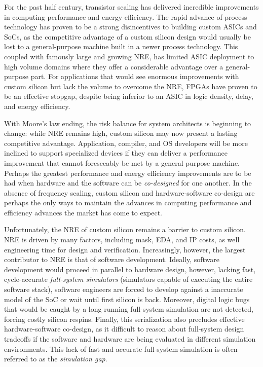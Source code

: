 For the past half century, transistor scaling has delivered incredible
improvements in computing performance and energy efficiency. The rapid advance
of process technology has proven to be a strong disincentives to building custom ASICs and SoCs, 
as the competitive advantage of a custom silicon design would usually be lost
to a general-purpose machine built in a newer process technology. This coupled
with famously large and growing NRE, has limited ASIC deployment to high volume
domains where they offer a considerable advantage over a general-purpose part.
For applications that would see enormous improvements with custom silicon but
lack the volume to overcome the NRE, FPGAs have proven to be an effective
stopgap, despite being inferior to an ASIC in logic density, delay, and energy
efficiency.

With Moore’s law ending, the risk balance for system architects is beginning to
change: while NRE remains high, custom silicon may now present a lasting
competitive advantage.  Application, compiler, and OS developers will be more
inclined to support specialized devices if they can deliver a performance
improvement that cannot foreseeably be met by a general purpose machine.
Perhaps the greatest performance and energy efficiency improvements are to be
had when hardware and the software can be \emph{co-designed} for one another.
In the absence of frequency scaling, custom silicon and hardware-software
co-design are perhaps the only ways to maintain the advances in computing
performance and efficiency advances the market has come to expect.

Unfortunately, the NRE of custom silicon remains a barrier to custom silicon.
NRE is driven by many factors, including mask, EDA, and IP costs, as well
engineering time for design and verification. Increasingly, however, the
largest contributor to NRE is that of software development.  Ideally, software
development would proceed in parallel to hardware design, however, lacking
fast, cycle-accurate \emph{full-system simulators} (simulators capable of
executing the entire software stack), software engineers are forced to develop
against a inaccurate model of the SoC or wait until first silicon is back.
Moreover, digital logic bugs that would be caught by a long running full-system
simulation are not detected, forcing costly silicon respins.  Finally, this
serialization also precludes effective hardware-software co-design, as it
difficult to reason about full-system design tradeoffs if the software and
hardware are being evaluated in different simulation environments. This lack of
fast and accurate full-system simulation is often referred to as the
\emph{simulation gap}.

